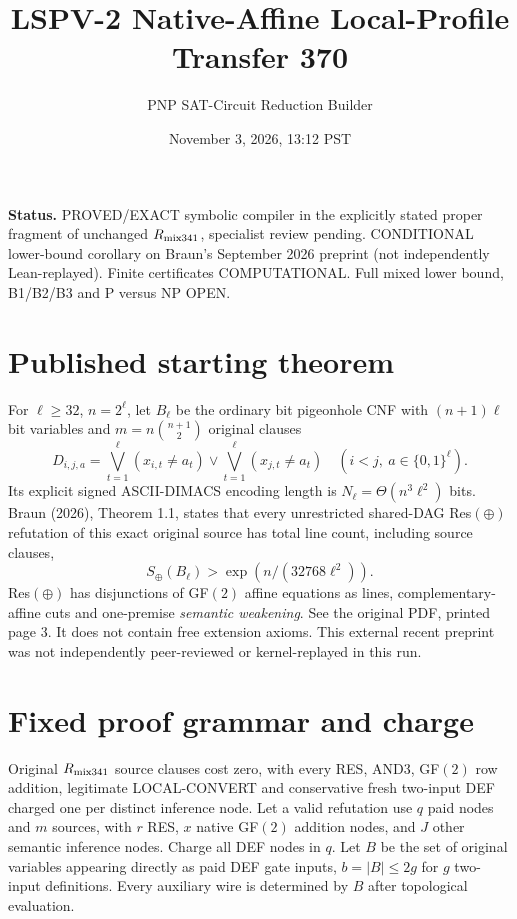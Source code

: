 \documentclass[11pt]{article}
\title{LSPV-2 Native-Affine Local-Profile Transfer 370}
\author{PNP SAT-Circuit Reduction Builder}
\date{November 3, 2026, 13:12 PST}
\begin{document}
\maketitle
\noindent\textbf{Status.} PROVED/EXACT symbolic compiler in the explicitly stated proper fragment of unchanged $R_{\rm mix341}$, specialist review pending. CONDITIONAL lower-bound corollary on Braun's September 2026 preprint (not independently Lean-replayed). Finite certificates COMPUTATIONAL. Full mixed lower bound, B1/B2/B3 and P versus NP OPEN.

\section*{Published starting theorem}
For $\ell\ge32$, $n=2^\ell$, let $B_\ell$ be the ordinary bit pigeonhole CNF with $(n+1)\ell$ bit variables and $m=n\binom{n+1}{2}$ original clauses
\[
D_{i,j,a}=\bigvee_{t=1}^\ell(x_{i,t}\ne a_t)\vee\bigvee_{t=1}^\ell(x_{j,t}\ne a_t)
\quad (i<j,\ a\in\{0,1\}^\ell).
\]
Its explicit signed ASCII-DIMACS encoding length is $N_\ell=\Theta(n^3\ell^2)$ bits. Braun (2026), Theorem 1.1, states that every unrestricted shared-DAG Res$(\oplus)$ refutation of this exact original source has total line count, including source clauses,
\[
 S_\oplus(B_\ell)>\exp(n/(32768\ell^2)).
\tag{B}
\]
Res$(\oplus)$ has disjunctions of GF$(2)$ affine equations as lines, complementary-affine cuts and one-premise \emph{semantic weakening}. See the original PDF, printed page 3. It does not contain free extension axioms. This external recent preprint was not independently peer-reviewed or kernel-replayed in this run.

\section*{Fixed proof grammar and charge}
Original $R_{\rm mix341}$ source clauses cost zero, with every RES, AND3, GF$(2)$ row addition, legitimate LOCAL-CONVERT and conservative fresh two-input DEF charged one per distinct inference node. Let a valid refutation use $q$ paid nodes and $m$ sources, with $r$ RES, $x$ native GF$(2)$ addition nodes, and $J$ other semantic inference nodes. Charge all DEF nodes in $q$. Let $B$ be the set of original variables appearing directly as paid DEF gate inputs, $b=|B|\le2g$ for $g$ two-input definitions. Every auxiliary wire is determined by $B$ after topological evaluation.
\end{document}
